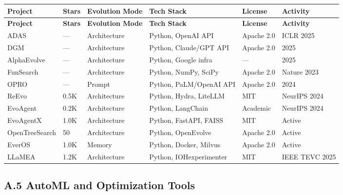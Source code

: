 \begin{longtable}{p{28mm}p{12mm}p{24mm}p{18mm}p{14mm}p{14mm}}
\toprule
\textbf{Project} & \textbf{Stars} & \textbf{Evolution Mode} & \textbf{Tech Stack} & \textbf{License} & \textbf{Activity} \\
\midrule
\endfirsthead
\toprule
\textbf{Project} & \textbf{Stars} & \textbf{Evolution Mode} & \textbf{Tech Stack} & \textbf{License} & \textbf{Activity} \\
\midrule
\endhead

ADAS & --- & Architecture & Python, OpenAI API & Apache 2.0 & ICLR 2025 \\
DGM & --- & Architecture & Python, Claude/GPT API & Apache 2.0 & 2025 \\
AlphaEvolve & --- & Architecture & Python, Google infra & --- & 2025 \\
FunSearch & --- & Architecture & Python, NumPy, SciPy & Apache 2.0 & Nature 2023 \\
OPRO & --- & Prompt & Python, PaLM/OpenAI API & Apache 2.0 & 2024 \\
ReEvo & 0.5K & Architecture & Python, Hydra, LiteLLM & MIT & NeurIPS 2024 \\
EvoAgent & 0.2K & Architecture & Python, LangChain & Academic & NeurIPS 2024 \\
EvoAgentX & 1.0K & Architecture & Python, FastAPI, FAISS & MIT & Active \\
OpenTreeSearch & 50 & Architecture & Python, OpenEvolve & Apache 2.0 & Active \\
EverOS & 1.0K & Memory & Python, Docker, Milvus & Apache 2.0 & Active \\
LLaMEA & 1.2K & Architecture & Python, IOHexperimenter & MIT & IEEE TEVC 2025 \\
\bottomrule
\end{longtable}

\subsection*{A.5 AutoML and Optimization Tools}

